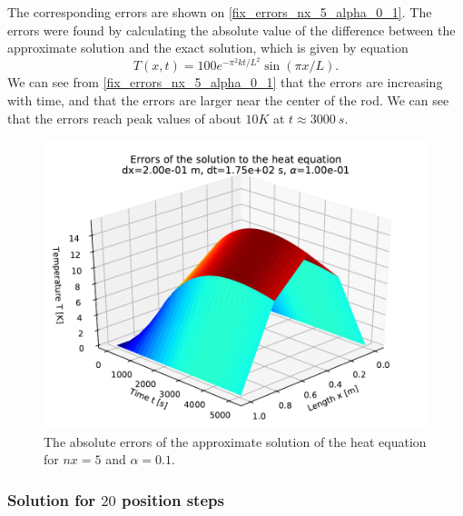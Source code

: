 The corresponding errors are shown on \autoref{fix_errors_nx_5_alpha_0_1}. The errors were found by calculating the absolute value of the difference between the approximate solution and the exact solution, which is given by equation
\[
  T(x,t) = 100 e^{- \pi^2 k t / L^2} \sin(\pi x / L).
\]
We can see from \autoref{fix_errors_nx_5_alpha_0_1} that the errors are increasing with time, and that the errors are larger near the center of the rod. We can see that the errors reach peak values of about $10 K$ at $t \approx 3000 \ s$.
\begin{figure}[H]
  \centering
  \includegraphics[width=1.0\textwidth]{figures/errors_alpha_1_00e_01.pdf}
  \caption{The absolute errors of the approximate solution of the heat equation for $nx=5$ and $\alpha = 0.1$.}
  \label{fix_errors_nx_5_alpha_0_1}
\end{figure}


\subsubsection*{Solution for $20$ position steps}

